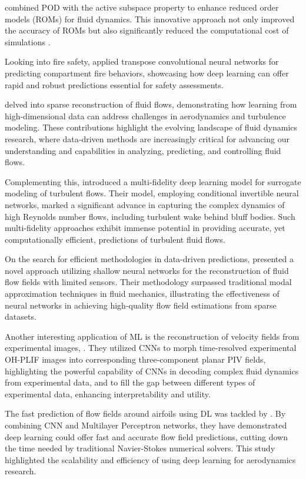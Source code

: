 \citet{Demo2019c} combined POD with the active subspace property to enhance reduced order models (ROMs) for fluid dynamics. This innovative approach not only improved the accuracy of ROMs but also significantly reduced the computational cost of simulations .

Looking into fire safety, \cite{Hodges2019c} applied transpose convolutional neural networks for predicting compartment fire behaviors, showcasing how deep learning can offer rapid and robust predictions essential for safety assessments.

\cite{Jayaraman2019a, Zhu2019} delved into sparse reconstruction of fluid flows, demonstrating how learning from high-dimensional data can address challenges in aerodynamics and turbulence modeling. These contributions highlight the evolving landscape of fluid dynamics research, where data-driven methods are increasingly critical for advancing our understanding and capabilities in analyzing, predicting, and controlling fluid flows.

Complementing this, \citet{Geneva2020c} introduced a multi-fidelity deep learning model for surrogate modeling of turbulent flows. Their model, employing conditional invertible neural networks, marked a significant advance in capturing the complex dynamics of high Reynolds number flows, including turbulent wake behind bluff bodies. Such multi-fidelity approaches exhibit immense potential in providing accurate, yet computationally efficient, predictions of turbulent fluid flows.

On the search for efficient methodologies in data-driven predictions,\citet{Erichson2020b} presented a novel approach utilizing shallow neural networks for the reconstruction of fluid flow fields with limited sensors. Their methodology surpassed traditional modal approximation techniques in fluid mechanics, illustrating the effectiveness of neural networks in achieving high-quality flow field estimations from sparse datasets.

Another interesting application of ML is the reconstruction of velocity fields from experimental images, \cite{Barwey2022c}. They utilized CNNs to morph time-resolved experimental OH-PLIF images into corresponding three-component planar PIV fields, highlighting the powerful capability of CNNs in decoding complex fluid dynamics from experimental data, and to fill the gap between different types of experimental data, enhancing interpretability and utility.

The fast prediction of flow fields around airfoils using DL was tackled by \citet{Sekar2019}. By combining CNN and Multilayer Perceptron networks, they have demonstrated deep learning could offer fast and accurate flow field predictions, cutting down the time needed by traditional Navier-Stokes numerical solvers. This study highlighted the scalability and efficiency of using deep learning for aerodynamics research.

